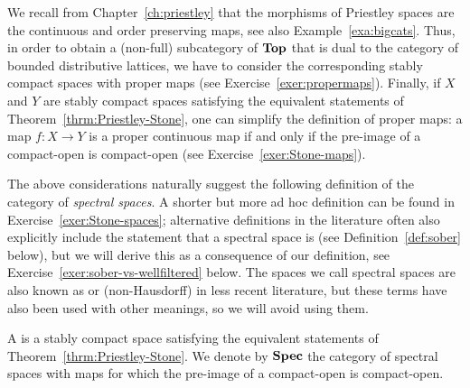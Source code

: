 We recall from Chapter~\ref{ch:priestley} that the morphisms of Priestley spaces are the continuous and order preserving maps, see also Example~\ref{exa:bigcats}. Thus, in order to obtain a (non-full) subcategory of $\mathbf{Top}$ that is dual to the category of bounded distributive lattices, we have to consider the corresponding stably compact spaces with proper maps (see Exercise~\ref{exer:propermaps}). Finally, if $X$ and $Y$ are stably compact spaces satisfying the equivalent statements of Theorem~\ref{thrm:Priestley-Stone}, one can simplify the definition of proper maps: a map $f\colon X\to Y$ is a proper continuous map if and only if the pre-image of a compact-open is compact-open  (see Exercise~\ref{exer:Stone-maps}).

The above considerations naturally suggest the following definition of the category of \emph{spectral spaces}. A shorter but more ad hoc definition can be found in Exercise~\ref{exer:Stone-spaces}; alternative definitions in the literature often also explicitly include the statement that a spectral space is  (see Definition~\ref{def:sober} below), but we will derive this as a consequence of our definition, see Exercise~\ref{exer:sober-vs-wellfiltered} below. The spaces we call spectral spaces are also known as  or (non-Hausdorff)  in less recent literature, but these terms have also been used with other meanings, so we will avoid using them.
\begin{definition}\label{def:StoneSpace}
A  is a stably compact space satisfying the equivalent statements of Theorem~\ref{thrm:Priestley-Stone}. We denote by $\mathbf{Spec}$ the category of spectral spaces with maps for which the pre-image of a compact-open is compact-open.
\end{definition}


